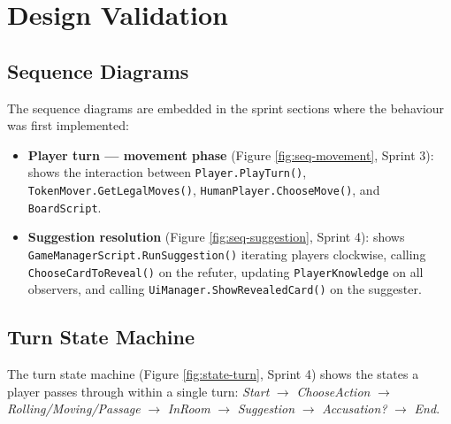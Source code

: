 \section{Design Validation}

\subsection*{Sequence Diagrams}

The sequence diagrams are embedded in the sprint sections where the behaviour was first implemented:

\begin{itemize}
    \item \textbf{Player turn --- movement phase} (Figure \ref{fig:seq-movement}, Sprint 3): shows the interaction between \texttt{Player.PlayTurn()}, \texttt{TokenMover.GetLegalMoves()}, \texttt{HumanPlayer.ChooseMove()}, and \texttt{BoardScript}.
    \item \textbf{Suggestion resolution} (Figure \ref{fig:seq-suggestion}, Sprint 4): shows \texttt{GameManagerScript.RunSuggestion()} iterating players clockwise, calling \texttt{ChooseCardToReveal()} on the refuter, updating \texttt{PlayerKnowledge} on all observers, and calling \texttt{UiManager.ShowRevealedCard()} on the suggester.
\end{itemize}

\subsection*{Turn State Machine}

The turn state machine (Figure \ref{fig:state-turn}, Sprint 4) shows the states a player passes through within a single turn: \textit{Start} $\to$ \textit{ChooseAction} $\to$ \textit{Rolling/Moving/Passage} $\to$ \textit{InRoom} $\to$ \textit{Suggestion} $\to$ \textit{Accusation?} $\to$ \textit{End}.

\newpage
